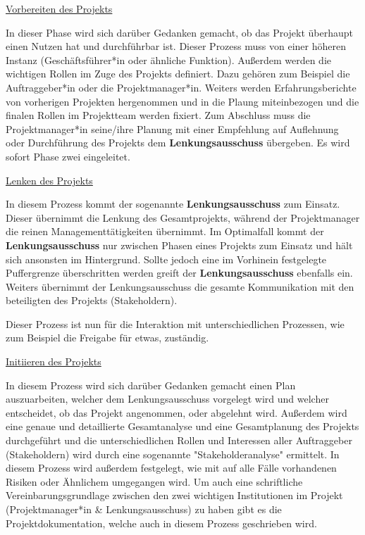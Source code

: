 \underline{Vorbereiten des Projekts}

In dieser Phase wird sich darüber Gedanken gemacht, ob das Projekt überhaupt einen Nutzen hat und durchführbar ist. Dieser Prozess muss von einer höheren Instanz (Geschäftsführer*in oder ähnliche Funktion). Außerdem werden die wichtigen Rollen im Zuge des Projekts definiert. Dazu gehören zum Beispiel die Auftraggeber*in oder die Projektmanager*in. Weiters werden Erfahrungsberichte von vorherigen Projekten hergenommen und in die Plaung miteinbezogen und die finalen Rollen im Projektteam werden fixiert. Zum Abschluss muss die Projektmanager*in seine/ihre Planung mit einer Empfehlung auf Auflehnung oder Durchführung des Projekts dem \textbf{Lenkungsausschuss} übergeben. Es wird sofort Phase zwei eingeleitet. \cite{Prince2}

\pagebreak
\underline{Lenken des Projekts}

In diesem Prozess kommt der sogenannte \textbf{Lenkungsausschuss} zum Einsatz. Dieser übernimmt die Lenkung des Gesamtprojekts, während der Projektmanager die reinen Managementtätigkeiten übernimmt. Im Optimalfall kommt der \textbf{Lenkungsausschuss} nur zwischen Phasen eines Projekts zum Einsatz und hält sich ansonsten im Hintergrund. Sollte jedoch eine im Vorhinein festgelegte Puffergrenze überschritten werden greift der \textbf{Lenkungsausschuss} ebenfalls ein. Weiters übernimmt der Lenkungsausschuss die gesamte Kommunikation mit den beteiligten des Projekts (Stakeholdern).

Dieser Prozess ist nun für die Interaktion mit unterschiedlichen Prozessen, wie zum Beispiel die Freigabe für etwas, zuständig. \cite{Prince2}

\underline{Initiieren des Projekts}

In diesem Prozess wird sich darüber Gedanken gemacht einen Plan auszuarbeiten, welcher dem Lenkungsausschuss vorgelegt wird und welcher entscheidet, ob das Projekt angenommen, oder abgelehnt wird. Außerdem wird eine genaue und detaillierte Gesamtanalyse und eine Gesamtplanung des Projekts durchgeführt und die unterschiedlichen Rollen und Interessen aller Auftraggeber (Stakeholdern) wird durch eine sogenannte "Stakeholderanalyse" ermittelt. In diesem Prozess wird außerdem festgelegt, wie mit auf alle Fälle vorhandenen Risiken oder Ähnlichem umgegangen wird. Um auch eine schriftliche Vereinbarungsgrundlage zwischen den zwei wichtigen Institutionen im Projekt (Projektmanager*in \& Lenkungsausschuss) zu haben gibt es die Projektdokumentation, welche auch in diesem Prozess geschrieben wird.

